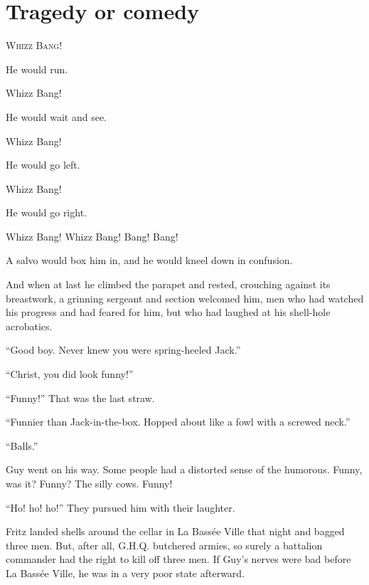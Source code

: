 \chapter*{\textsf{Tragedy or comedy}}

W\textsc{hizz} B\textsc{ang}!

He would run.

Whizz Bang!

He would wait and see.

Whizz Bang!

He would go left.

Whizz Bang!

He would go right.

Whizz Bang! Whizz Bang! Bang! Bang!

A salvo would box him in, and he would kneel down in confusion.

And when at last he climbed the parapet and rested, crouching against its breastwork, a grinning sergeant and section welcomed him, men who had watched his progress and had feared for him, but who had laughed at his shell-hole acrobatics.

``Good boy. Never knew you were spring-heeled Jack.''

``Christ, you did look funny!''

``Funny!'' That was the last straw.

``Funnier than Jack-in-the-box. Hopped about like a fowl with a screwed neck.''

``Balls.''

Guy went on his way. Some people had a distorted sense of the humorous. Funny, was it? Funny? The silly cows. Funny!

``Ho! ho! ho!'' They pursued him with their laughter.

Fritz landed shells around the cellar in La Bass\'{e}e Ville that night and bagged three men. But, after all, G.H.Q. butchered armies, so surely a battalion commander had the right to kill off three men. If Guy's nerves were bad before La Bass\'{e}e Ville, he was in a very poor state afterward.
